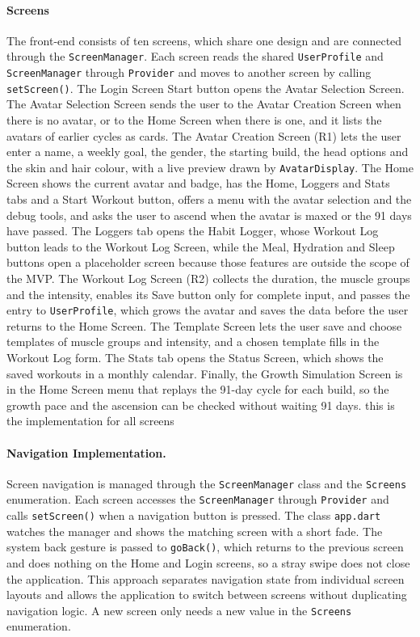 \documentclass[11pt]{article}
\begin{document}
\paragraph{Screens}
The front-end consists of ten screens, which share one design and are connected through the \texttt{ScreenManager}. Each screen reads the shared \texttt{UserProfile} and \texttt{ScreenManager} through \texttt{Provider} and moves to another screen by calling \texttt{setScreen()}. The Login Screen Start button opens the Avatar Selection Screen. The Avatar Selection Screen sends the user to the Avatar Creation Screen when there is no avatar, or to the Home Screen when there is one, and it lists the avatars of earlier cycles as cards. The Avatar Creation Screen (R1) lets the user enter a name, a weekly goal, the gender, the starting build, the head options and the skin and hair colour, with a live preview drawn by \texttt{AvatarDisplay}. The Home Screen shows the current avatar and badge, has the Home, Loggers and Stats tabs and a Start Workout button, offers a menu with the avatar selection and the debug tools, and asks the user to ascend when the avatar is maxed or the 91 days have passed. The Loggers tab opens the Habit Logger, whose Workout Log button leads to the Workout Log Screen, while the Meal, Hydration and Sleep buttons open a placeholder screen because those features are outside the scope of the MVP. The Workout Log Screen (R2) collects the duration, the muscle groups and the intensity, enables its Save button only for complete input, and passes the entry to \texttt{UserProfile}, which grows the avatar and saves the data before the user returns to the Home Screen. The Template Screen lets the user save and choose templates of muscle groups and intensity, and a chosen template fills in the Workout Log form. The Stats tab opens the Status Screen, which shows the saved workouts in a monthly calendar. Finally, the Growth Simulation Screen is in the Home Screen menu that replays the 91-day cycle for each build, so the growth pace and the ascension can be checked without waiting 91 days.
this is the implementation for all screens

\paragraph{Navigation Implementation.}
Screen navigation is managed through the \texttt{ScreenManager} class and the \texttt{Screens} enumeration. Each screen accesses the \texttt{ScreenManager} through \texttt{Provider} and calls \texttt{setScreen()} when a navigation button is pressed. The class \texttt{app.dart} watches the manager and shows the matching screen with a short fade. The system back gesture is passed to \texttt{goBack()}, which returns to the previous screen and does nothing on the Home and Login screens, so a stray swipe does not close the application. This approach separates navigation state from individual screen layouts and allows the application to switch between screens without duplicating navigation logic. A new screen only needs a new value in the \texttt{Screens} enumeration.
\end{document}
